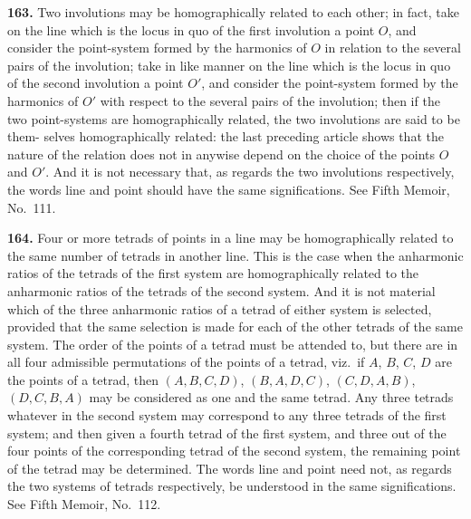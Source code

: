 \documentclass[11pt,a4paper]{book}
\begin{document}
\begin{center}
\textbf{163.} Two involutions may be homographically related to each other; in fact,
take on the line which is the locus in quo of the first involution a point $O$, and
consider the point-system formed by the harmonics of $O$ in relation to the several
pairs of the involution; take in like manner on the line which is the locus in quo
of the second involution a point $O'$, and consider the point-system formed by the
harmonics of $O'$ with respect to the several pairs of the involution; then if the two
point-systems are homographically related, the two involutions are said to be them-
selves homographically related: the last preceding article shows that the nature of
the relation does not in anywise depend on the choice of the points $O$ and $O'$.
And it is not necessary that, as regards the two involutions respectively, the words
line and point should have the same significations. See Fifth Memoir, No.~111.

\textbf{164.} Four or more tetrads of points in a line may be homographically related
to the same number of tetrads in another line. This is the case when the anharmonic
ratios of the tetrads of the first system are homographically related to the anharmonic
ratios of the tetrads of the second system. And it is not material which of the three
anharmonic ratios of a tetrad of either system is selected, provided that the same
selection is made for each of the other tetrads of the same system. The order of the
points of a tetrad must be attended to, but there are in all four admissible permutations
of the points of a tetrad, viz.\ if $A$, $B$, $C$, $D$ are the points of a tetrad, then $(A,B,C,D)$,
$(B,A,D,C)$, $(C,D,A,B)$, $(D,C,B,A)$ may be considered as one and the same tetrad.
Any three tetrads whatever in the second system may correspond to any three tetrads
of the first system; and then given a fourth tetrad of the first system, and three out
of the four points of the corresponding tetrad of the second system, the remaining
point of the tetrad may be determined. The words line and point need not, as regards
the two systems of tetrads respectively, be understood in the same significations.
See Fifth Memoir, No.~112.


\end{center}
\end{document}
